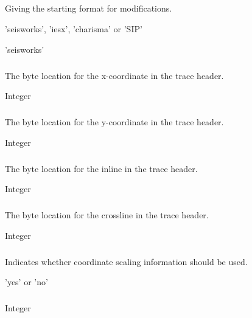 \subparagraph{}
 \slist
   \item \Description Giving the starting format for modifications.
   \item \Argument 'seisworks', 'iesx', 'charisma' or 'SIP'
   \item \Default 'seisworks'
 \elist

\subparagraph{}
 \slist
   \item \Description The byte location for the x-coordinate in the trace header.
   \item \Argument Integer
   \item \Default
 \elist

\subparagraph{}
 \slist
   \item \Description The byte location for the y-coordinate in the trace header.
   \item \Argument Integer
   \item \Default
 \elist

\subparagraph{}
 \slist
   \item \Description The byte location for the inline in the trace header.
   \item \Argument Integer
   \item \Default
 \elist

\subparagraph{}
 \slist
   \item \Description The byte location for the crossline in the trace header.
   \item \Argument Integer
   \item \Default
 \elist

\subparagraph{}
 \slist
   \item \Description Indicates whether coordinate scaling information should be used.
   \item \Argument 'yes' or 'no'
   \item \Default
 \elist

\subparagraph{}
 \slist
   \item \Description
   \item \Argument Integer
   \item \Default
 \elist

